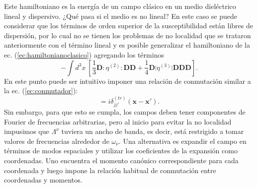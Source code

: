 Este hamiltoniano es la energ\'{i}a de un campo cl\'{a}sico en un medio diel\'{e}ctrico lineal y dispersivo. ¿Qu\'{e} pasa si el medio es no lineal? En este caso se puede considerar que los t\'{e}rminos de orden superior de la susceptibilidad est\'an libres de dispersi\'{o}n, por lo cual no se tienen los problemas de no localidad que se trataron anteriormente con el t\'{e}rmino lineal y es posible generalizar el hamiltoniano de la ec. (\ref{ec:hamiltonianoclasico}) agregando los t\'{e}rminos
\begin{equation}
-\int d^3x \ [\frac{1}{3}\textbf{D}:\eta^{(2)}:\textbf{D}\textbf{D}+\frac{1}{4}\textbf{D}\vdots \eta^{(3)}\vdots\textbf{D}\textbf{D}\textbf{D}].
\end{equation}
En este punto puede ser intuitivo imponer una relaci\'{o}n de conmutaci\'{o}n similar a la ec. (\ref{ec:conmutador}):
\begin{equation}
[\Lambda_j^{\nu}(\textbf{x},t), \Pi_{j'}^{\nu}(\textbf{x}',t)]=i\delta_{jj'}^{(tr)}(\textbf{x}-\textbf{x}').
\end{equation}
Sin embargo, para que esto se cumpla, los campos deben tener componentes de Fourier de frecuencias arbitrarias, pero al inicio para evitar la no localidad impusimos que $\Lambda^{\nu}$ tuviera un ancho de banda, es decir, est\'{a} restrigido a tomar valores de frecuencias alrededor de $\omega_{\nu}$. Una alternativa es expandir el campo en t\'{e}rminos de modos espaciales y utilizar los coeficientes de la expansi\'{o}n como coordenadas. Uno encuentra el momento canónico correspondiente para cada coordenada y luego impone la relaci\'{o}n habitual de conmutación entre coordenadas y momentos.\\

